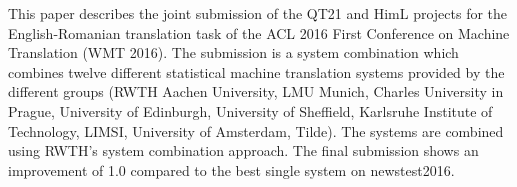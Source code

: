 This paper describes the joint submission of the QT21 and HimL projects for the English-Romanian translation task of the ACL 2016 First Conference on Machine Translation (WMT 2016). The submission is a system combination which combines twelve different statistical machine translation systems provided by the different groups (RWTH Aachen University, LMU Munich, Charles University in Prague, University of Edinburgh, University of Sheffield, Karlsruhe Institute of Technology, LIMSI, University of Amsterdam, Tilde). The systems are combined using RWTH's system combination approach. The final submission shows an improvement of 1.0 \BLEU compared to the best single system on newstest2016.
